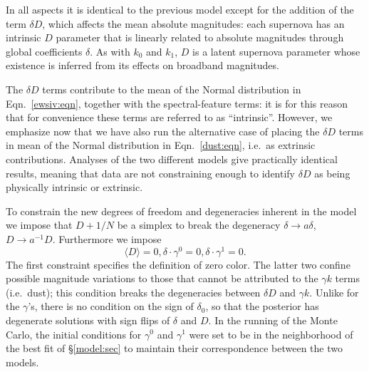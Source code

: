 \documentclass{aastex61}   	%
\begin{document}
In all aspects it is identical to the previous model except for the addition of the term $\delta D$,
which affects the mean
absolute magnitudes:
each supernova has an intrinsic $D$ parameter that is linearly related to
absolute magnitudes through global coefficients $\delta$.  As with $k_0$ and $k_1$,  $D$ is a latent supernova parameter whose existence is inferred from
its effects on broadband magnitudes.

\color{red}
The $\delta D$ terms contribute to the mean of the Normal distribution in Eqn.~\ref{ewsiv:eqn}, together with the spectral-feature terms:
it is for this reason that for convenience these terms are referred to as ``intrinsic''.
However, we emphasize now that we have also run the alternative case  of placing the
$\delta D$ terms in mean of the Normal distribution in Eqn.~\ref{dust:eqn}, i.e.\ as extrinsic contributions.
Analyses of the two different models give practically identical results, meaning that data are not constraining enough
to identify $\delta D$ as being physically intrinsic or extrinsic.
\color{black}

To constrain the new degrees of freedom and degeneracies inherent in the model we impose that
$D+1/N$ be a simplex to break the 
degeneracy  $\delta \rightarrow a\delta$, $D \rightarrow a^{-1}D$.
Furthermore we impose
\begin{equation}
\langle D\rangle=0,  \delta \cdot \gamma^0=0, \delta \cdot \gamma^1=0.
\end{equation}
The first constraint specifies the definition of zero color.   The latter two confine possible magnitude
variations to those that cannot be attributed to 
the $\gamma k$ terms (i.e.\ dust); this condition breaks the degeneracies between $\delta D$  
and $\gamma k$. 
Unlike for the $\gamma$'s, there is no condition on the sign of $\delta_0$,
so that the posterior has degenerate solutions with sign flips of $\delta$ and $D$.
In the running of the Monte Carlo, the initial conditions for
$\gamma^0$ and $\gamma^1$ were set to be in the neighborhood of the best fit of \S\ref{model:sec}
to maintain their correspondence between the two models. 
\end{document}
